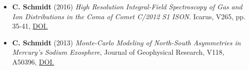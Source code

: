 \documentclass[12pt]{report}
\begin{document}
\begin{itemize}
  \item \textbf{C. Schmidt} (2016) \textit{High Resolution Integral-Field Spectroscopy of Gas and Ion Distributions in the Coma of Comet C/2012 S1 ISON}. Icarus, V265, pp. 35-41, \href{https://doi.org/10.1016/j.icarus.2015.10.009}{DOI.}
  \item \textbf{C. Schmidt} (2013) \textit{Monte-Carlo Modeling of North-South Asymmetries in Mercury's Sodium Exosphere}, Journal of Geophysical Research, V118, A50396, \href{https://doi.org/10.1002/jgra.50396}{DOI.}
 \end{itemize}
\end{document}
